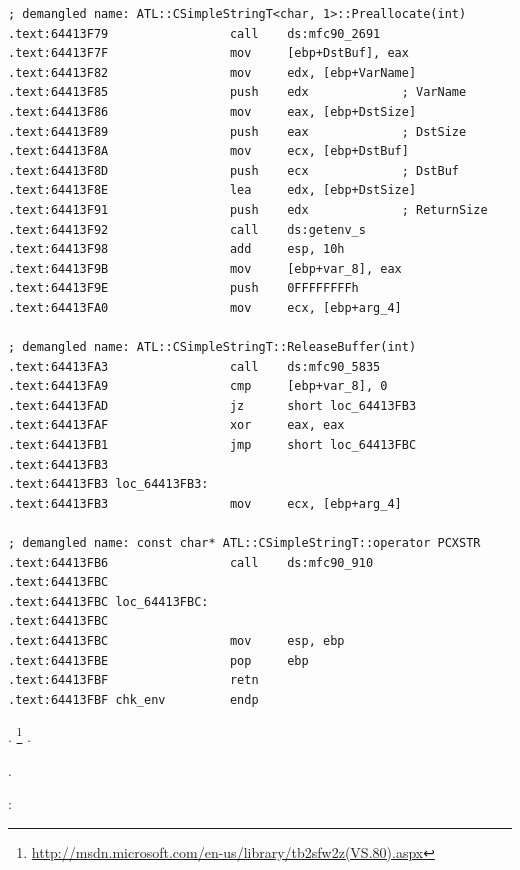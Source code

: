 \begin{lstlisting}
; demangled name: ATL::CSimpleStringT<char, 1>::Preallocate(int)
.text:64413F79                 call    ds:mfc90_2691
.text:64413F7F                 mov     [ebp+DstBuf], eax
.text:64413F82                 mov     edx, [ebp+VarName]
.text:64413F85                 push    edx             ; VarName
.text:64413F86                 mov     eax, [ebp+DstSize]
.text:64413F89                 push    eax             ; DstSize
.text:64413F8A                 mov     ecx, [ebp+DstBuf]
.text:64413F8D                 push    ecx             ; DstBuf
.text:64413F8E                 lea     edx, [ebp+DstSize]
.text:64413F91                 push    edx             ; ReturnSize
.text:64413F92                 call    ds:getenv_s
.text:64413F98                 add     esp, 10h
.text:64413F9B                 mov     [ebp+var_8], eax
.text:64413F9E                 push    0FFFFFFFFh
.text:64413FA0                 mov     ecx, [ebp+arg_4]

; demangled name: ATL::CSimpleStringT::ReleaseBuffer(int)
.text:64413FA3                 call    ds:mfc90_5835
.text:64413FA9                 cmp     [ebp+var_8], 0
.text:64413FAD                 jz      short loc_64413FB3
.text:64413FAF                 xor     eax, eax
.text:64413FB1                 jmp     short loc_64413FBC
.text:64413FB3
.text:64413FB3 loc_64413FB3:
.text:64413FB3                 mov     ecx, [ebp+arg_4]

; demangled name: const char* ATL::CSimpleStringT::operator PCXSTR 
.text:64413FB6                 call    ds:mfc90_910
.text:64413FBC
.text:64413FBC loc_64413FBC:
.text:64413FBC
.text:64413FBC                 mov     esp, ebp
.text:64413FBE                 pop     ebp
.text:64413FBF                 retn
.text:64413FBF chk_env         endp
\end{lstlisting}

.  \footnote{\url{http://msdn.microsoft.com/en-us/library/tb2sfw2z(VS.80).aspx}} 
.

.

:

